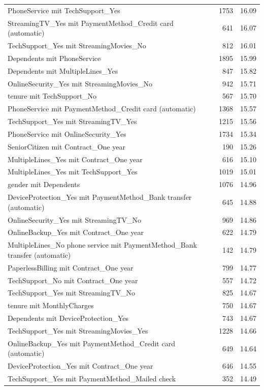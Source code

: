 \documentclass[a4paper,11pt]{article}
\begin{document}
\begin{longtable}{p{9cm}rr}
PhoneService mit TechSupport\_Yes & 1753 & 16.09 \\
StreamingTV\_Yes mit PaymentMethod\_Credit card (automatic) & 641 & 16.07 \\
TechSupport\_Yes mit StreamingMovies\_No & 812 & 16.01 \\
Dependents mit PhoneService & 1895 & 15.99 \\
Dependents mit MultipleLines\_Yes & 847 & 15.82 \\
OnlineSecurity\_Yes mit StreamingMovies\_No & 942 & 15.71 \\
tenure mit TechSupport\_No & 567 & 15.70 \\
PhoneService mit PaymentMethod\_Credit card (automatic) & 1368 & 15.57 \\
TechSupport\_Yes mit StreamingTV\_Yes & 1215 & 15.56 \\
PhoneService mit OnlineSecurity\_Yes & 1734 & 15.34 \\
SeniorCitizen mit Contract\_One year & 190 & 15.26 \\
MultipleLines\_Yes mit Contract\_One year & 616 & 15.10 \\
MultipleLines\_Yes mit TechSupport\_Yes & 1019 & 15.01 \\
gender mit Dependents & 1076 & 14.96 \\
DeviceProtection\_Yes mit PaymentMethod\_Bank transfer (automatic) & 645 & 14.88 \\
OnlineSecurity\_Yes mit StreamingTV\_No & 969 & 14.86 \\
OnlineBackup\_Yes mit Contract\_One year & 622 & 14.79 \\
MultipleLines\_No phone service mit PaymentMethod\_Bank transfer (automatic) & 142 & 14.79 \\
PaperlessBilling mit Contract\_One year & 799 & 14.77 \\
TechSupport\_No mit Contract\_One year & 557 & 14.72 \\
TechSupport\_Yes mit StreamingTV\_No & 825 & 14.67 \\
tenure mit MonthlyCharges & 750 & 14.67 \\
Dependents mit DeviceProtection\_Yes & 743 & 14.67 \\
TechSupport\_Yes mit StreamingMovies\_Yes & 1228 & 14.66 \\
OnlineBackup\_Yes mit PaymentMethod\_Credit card (automatic) & 649 & 14.64 \\
DeviceProtection\_Yes mit Contract\_One year & 646 & 14.55 \\
TechSupport\_Yes mit PaymentMethod\_Mailed check & 352 & 14.49 \\

\end{longtable}
\end{document}
